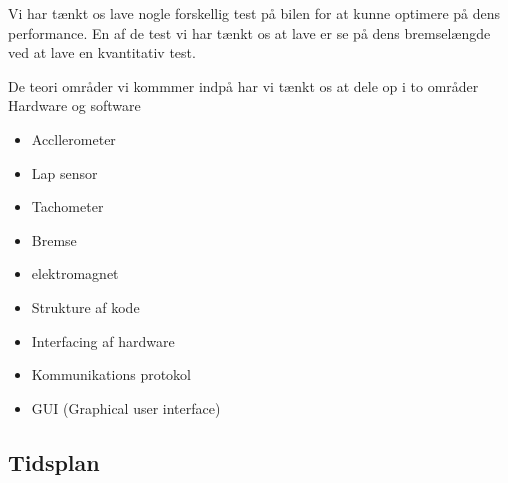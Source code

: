 Vi har tænkt os lave nogle forskellig test på bilen for at kunne optimere på dens performance. En af de test vi har tænkt os at lave er se på dens bremselængde ved at lave en kvantitativ test.

De teori områder vi kommmer indpå har vi tænkt os at dele op i to områder Hardware og software

\item[Hardware] \hfill
		\begin{itemize}
			\item Accllerometer
			\item Lap sensor
			\item Tachometer
			\item Bremse
			\item elektromagnet
		\end{itemize}
		
\item[Software] \hfill
		\begin{itemize}
			\item Strukture af kode
			\item Interfacing af hardware
			\item Kommunikations protokol
			\item GUI (Graphical user interface)
		\end{itemize}
 

\subsection{Tidsplan}